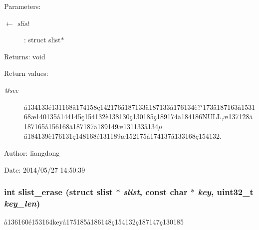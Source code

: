\begin{Desc}
\item[Parameters:]
\begin{description}
\item[\mbox{$\leftarrow$} {\em slist}]: struct slist$\ast$ \end{description}
\end{Desc}
\begin{Desc}
\item[Returns:]void \end{Desc}
\begin{Desc}
\item[Return values:]
\begin{description}
\item[{\em @see}]\aa{}134133\'{e}131168\aa{}174158\c{c}142176\"{a}187133\"{a}187133\aa{}176134\`{e}?`173\"{a}187163\aa{}153168\ae{}140135\aa{}144145\c{c}154132\`{e}138130\c{c}130185\c{c}189174\"{a}184186NULL,\ae{}137128\"{a}187165\aa{}156168\"{a}187187\"{a}189149\ae{}131133\aa{}134$\mu$\"{a}184139\`{e}176131\c{c}148168\'{e}131189\ae{}152175\aa{}174137\aa{}133168\c{c}154132. \end{description}
\end{Desc}
\begin{Desc}
\item[Author:]liangdong \end{Desc}
\begin{Desc}
\item[Date:]2014/05/27 14:50:39 \end{Desc}
\subsubsection{\setlength{\rightskip}{0pt plus 5cm}int slist\_\-erase (struct slist $\ast$ {\em slist}, const char $\ast$ {\em key}, uint32\_\-t {\em key\_\-len})}\label{slist_8h_a3}


\aa{}136160\'{e}153164key\aa{}175185\aa{}186148\c{c}154132\c{c}187147\c{c}130185 

